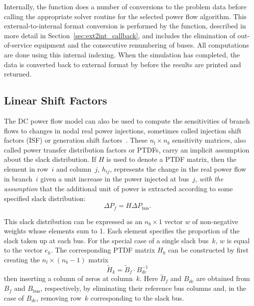 \documentclass[12pt]{article}
\newcommand{\code}[1]{{\relsize{-0.5}{\tt{{#1}}}}}  %
\numberwithin{equation}{section}
\numberwithin{table}{section}
\numberwithin{figure}{section}
\begin{document}
Internally, the \code{runpf} function does a number of conversions to the problem data before calling the appropriate solver routine for the selected power flow algorithm. This external-to-internal format conversion is performed by the \code{ext2int} function, described in more detail in Section~\ref{sec:ext2int_callback}, and includes the elimination of out-of-service equipment and the consecutive renumbering of buses. All computations are done using this internal indexing. When the simulation has completed, the data is converted back to external format by \code{int2ext} before the results are printed and returned.

\subsection{Linear Shift Factors}
\label{sec:lsf}

The DC power flow model can also be used to compute the sensitivities of branch flows to changes in nodal real power injections, sometimes called injection shift factors (ISF) or generation shift factors~\cite{wood1996}. These $n_l \times n_b$ sensitivity matrices, also called power transfer distribution factors or PTDFs, carry an implicit assumption about the slack distribution. If $H$ is used to denote a PTDF matrix, then the element in row~$i$ and column~$j$, $h_{ij}$, represents the change in the real power flow in branch~$i$ given a unit increase in the power injected at bus~$j$, \emph{with the assumption} that the additional unit of power is extracted according to some specified slack distribution:
\begin{equation}
\Delta P_f = H \Delta P_\mathrm{bus}.
\end{equation}

This slack distribution can be expressed as an $n_b \times 1$ vector $w$ of non-negative weights whose elements sum to 1. Each element specifies the proportion of the slack taken up at each bus. For the special case of a single slack bus~$k$, $w$ is equal to the vector $e_k$. The corresponding PTDF matrix $H_k$ can be constructed by first creating the $n_l \times (n_b-1)$ matrix
\begin{equation}
\widetilde{H}_k = \widetilde{B}_f \cdot B_{dc}^{-1}
\end{equation}
then inserting a column of zeros at column~$k$. Here $\widetilde B_f$ and $B_{dc}$ are obtained from $B_f$ and $B_\mathrm{bus}$, respectively, by eliminating their reference bus columns and, in the case of $B_{dc}$, removing row~$k$ corresponding to the slack bus.
\end{document}
